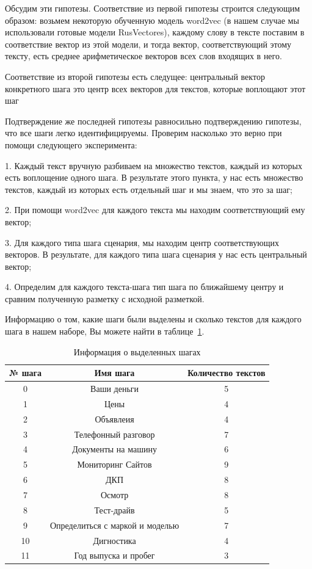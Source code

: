 \documentclass[12pt]{article}
\begin{document}
Обсудим эти гипотезы. Соответствие из первой гипотезы строится следующим образом: возьмем некоторую обученную модель word2vec (в нашем случае мы использовали готовые модели RusVectores), каждому слову в тексте поставим в соответствие вектор из этой модели, и тогда вектор, соответствующий этому тексту, есть среднее арифметическое векторов всех слов входящих в него.

Соответствие из второй гипотезы есть следущее: центральный вектор конкретного шага это центр всех векторов для текстов, которые воплощают этот шаг

Подтверждение же последней гипотезы равносильно подтверждению гипотезы, что все шаги легко идентифицируемы. Проверим насколько это верно при помощи следующего эксперимента:

1. Каждый текст вручную разбиваем на множество текстов, каждый из которых есть воплощение одного шага. В результате этого пункта, у нас есть множество текстов, каждый из которых есть отдельный шаг и мы знаем, что это за шаг;

2. При помощи word2vec для каждого текста мы находим соответствующий ему вектор;

3.  Для каждого типа шага сценария, мы находим центр соответствующих векторов. В результате, для каждого типа шага сценария у нас есть центральный вектор;

4. Определим для каждого текста-шага тип шага по ближайшему центру и сравним полученную разметку с исходной разметкой.

Информацию о том, какие шаги были выделены и сколько текстов для каждого шага в нашем наборе, Вы можете найти в таблице~\ref{table:2.0}.

\begin{table}[h!]
\centering
\begin{tabular}{||c|c|c||} 
 \hline
 № шага & Имя шага &Количество текстов\\
 \hline
 0&  Ваши деньги&5\\ 
 1&  Цены&4  \\ 
 2&  Объявлеия&4  \\ 
 3&  Телефонный разговор&7  \\ 
  4&  Документы на машину&6  \\ 
 5&  Мониторинг Сайтов&9\\ 
 6&  ДКП&8  \\ 
 7&  Осмотр&8  \\ 
 8&  Тест-драйв&5  \\ 
 9&  Определиться с маркой и моделью&7  \\ 
 10&  Дигностика&4  \\ 
 11&  Год выпуска и пробег&3  \\ 
 \hline
\end{tabular}
\caption{Информация о выделенных шагах}
\label{table:2.0}
\end{table}
\end{document}
